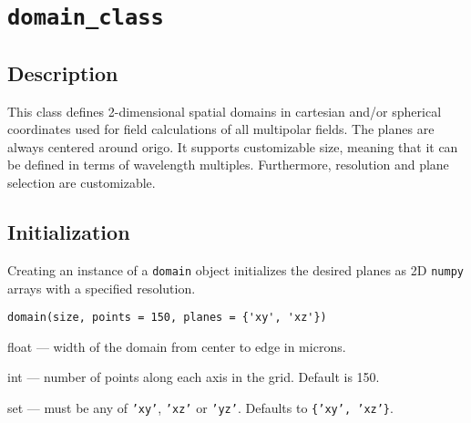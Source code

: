 \section{\texttt{domain\_class}}

\subsection{Description}
This class defines 2-dimensional spatial domains in cartesian and/or spherical coordinates used for field calculations of all multipolar fields. The planes are always centered around origo.
It supports customizable size, meaning that it can be defined in terms of wavelength multiples. Furthermore, resolution and plane selection are customizable.

\subsection{Initialization}
Creating an instance of a \texttt{domain} object initializes the desired planes as 2D \texttt{numpy} arrays with a specified resolution.

\begin{verbatim}
domain(size, points = 150, planes = {'xy', 'xz'})
\end{verbatim}

\begin{description}[leftmargin=3cm]
    \item[size:] float — width of the domain from center to edge in microns.
    \item[points:] int — number of points along each axis in the grid. Default is 150.
    \item[planes:] set — must be any of \texttt{'xy'}, \texttt{'xz'} or \texttt{'yz'}. Defaults to \texttt{\{'xy', 'xz'\}}.
\end{description}

